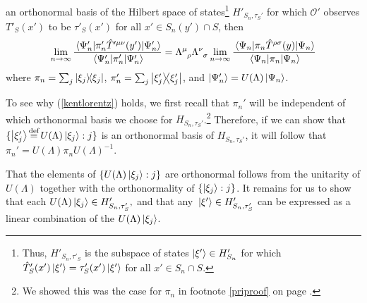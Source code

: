  an orthonormal basis of the Hilbert space %
  of states\footnote{Thus,  $H'_{S_n,\tau'_S}$ is the subspace of states $\ket{\xi'}\in H'_{S_n}$ for which  $\hat{T}'_S(x')\ket{\xi'}=\tau'_S(x')\ket{\xi'}$  for all $x'\in S_n\cap S$. } $H'_{S_n,\tau_S'}$ for which $\mathcal{O}'$ observes $T'_S(x')$ to be $\tau'_S(x')$ for all $x'\in S_n(y')\cap S$, then
\begin{equation}\label{kentlorentz}
\lim_{n\rightarrow\infty}\frac{\ev{\pi_n'\hat{T}^{\prime\mu\nu}(y')}{\Psi_n'}}{\ev{\pi_n'}{\Psi_n'}}=\Lambda\indices{^\mu_\rho}\Lambda\indices{^\nu_\sigma} \lim_{n\rightarrow\infty}\frac{\ev{\pi_n\hat{T}^{\rho\sigma}(y)}{\Psi_n}}{\ev{\pi_n}{\Psi_n}}
\end{equation}
where $\pi_n=\sum_j\dyad{\xi_j}$, $\pi_n'=\sum_j\dyad{\xi_j'}$, and $\ket{\Psi_n'}=U(\Lambda)\ket{\Psi_n}$.  %
%

To see why (\ref{kentlorentz}) holds, we first recall that $\pi_n'$ will be independent of which orthonormal basis we choose for $H_{S_n,\tau_S'}$.\footnote{We showed this was the case for $\pi_n$ in footnote \ref{priproof} on page \pageref{priproof}.} Therefore, if we can show that $\{\ket{\xi_j'}\myeq U(\Lambda)\ket{\xi_j}:j\}$ is an orthonormal basis of $H_{S_n,\tau_S'}$, it will follow that $\pi_n'=U(\Lambda)\pi_nU(\Lambda)^{-1}$. 

That the elements of $\{U(\Lambda)\ket{\xi_j}:j\}$ are orthonormal follows from the unitarity of $U(\Lambda)$ together with the orthonormality of  $\{\ket{\xi_j}:j\}$. 
It remains for us to show that each $U(\Lambda)\ket*{\xi_j}\in H'_{S_n,\tau_S'},$ and that any $\ket*{\xi'}\in H'_{S_n,\tau_S'}$ can be expressed as a linear combination of the $U(\Lambda)\ket*{\xi_j}$.

